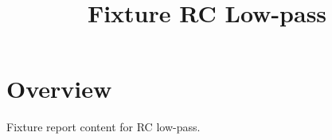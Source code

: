 \documentclass{article}
\title{Fixture RC Low-pass}
\begin{document}
\maketitle
\section{Overview}
Fixture report content for RC low-pass.
\end{document}
